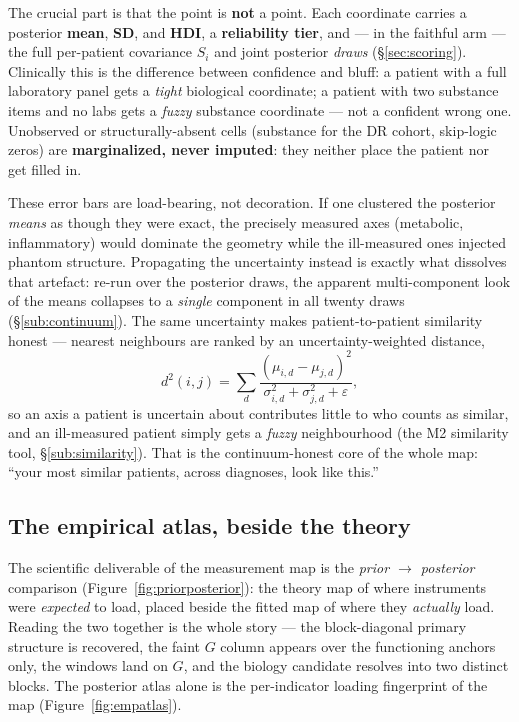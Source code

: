 The crucial part is that the point is \textbf{not} a point. Each coordinate carries a posterior \textbf{mean},
\textbf{SD}, and \textbf{HDI}, a \textbf{reliability tier}, and --- in the faithful arm --- the full per-patient
covariance $S_i$ and joint posterior \emph{draws} (\S\ref{sec:scoring}). Clinically this is the difference
between confidence and bluff: a patient with a full laboratory panel gets a \emph{tight} biological coordinate;
a patient with two substance items and no labs gets a \emph{fuzzy} substance coordinate --- not a confident
wrong one. Unobserved or structurally-absent cells (substance for the DR cohort, skip-logic zeros) are
\textbf{marginalized, never imputed}: they neither place the patient nor get filled in.

These error bars are load-bearing, not decoration. If one clustered the posterior \emph{means} as though they
were exact, the precisely measured axes (metabolic, inflammatory) would dominate the geometry while the
ill-measured ones injected phantom structure. Propagating the uncertainty instead is exactly what dissolves that
artefact: re-run over the posterior draws, the apparent multi-component look of the means collapses to a
\emph{single} component in all twenty draws (\S\ref{sub:continuum}). The same uncertainty makes
patient-to-patient similarity honest --- nearest neighbours are ranked by an uncertainty-weighted distance,
\begin{equation}
d^2(i,j)=\sum_d \frac{(\mu_{i,d}-\mu_{j,d})^2}{\sigma_{i,d}^2+\sigma_{j,d}^2+\varepsilon},
\label{eq:uwdist}
\end{equation}
so an axis a patient is uncertain about contributes little to who counts as similar, and an ill-measured patient
simply gets a \emph{fuzzy} neighbourhood (the M2 similarity tool, \S\ref{sub:similarity}). That is the
continuum-honest core of the whole map: ``your most similar patients, across diagnoses, look like this.''

\subsection{The empirical atlas, beside the theory}
The scientific deliverable of the measurement map is the \emph{prior $\to$ posterior} comparison
(Figure~\ref{fig:priorposterior}): the theory map of where instruments were \emph{expected} to load, placed
beside the fitted map of where they \emph{actually} load. Reading the two together is the whole story --- the
block-diagonal primary structure is recovered, the faint $G$ column appears over the functioning anchors only,
the windows land on $G$, and the biology candidate resolves into two distinct blocks. The posterior atlas alone
is the per-indicator loading fingerprint of the map (Figure~\ref{fig:empatlas}).

